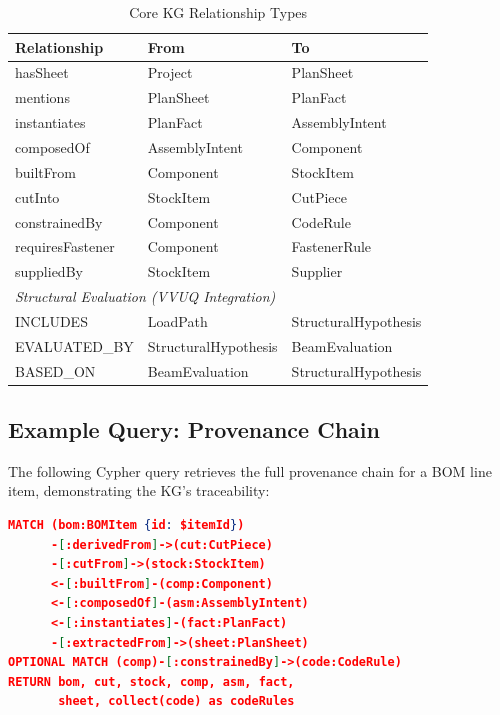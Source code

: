 \begin{table}[ht]
\centering
\caption{Core KG Relationship Types}
\label{tab:kg_relationships}
\begin{tabular}{lll}
\toprule
\textbf{Relationship} & \textbf{From} & \textbf{To} \\
\midrule
hasSheet & Project & PlanSheet \\
mentions & PlanSheet & PlanFact \\
instantiates & PlanFact & AssemblyIntent \\
composedOf & AssemblyIntent & Component \\
builtFrom & Component & StockItem \\
cutInto & StockItem & CutPiece \\
constrainedBy & Component & CodeRule \\
requiresFastener & Component & FastenerRule \\
suppliedBy & StockItem & Supplier \\
\midrule
\multicolumn{3}{l}{\textit{Structural Evaluation (VVUQ Integration)}} \\
\midrule
INCLUDES & LoadPath & StructuralHypothesis \\
EVALUATED\_BY & StructuralHypothesis & BeamEvaluation \\
BASED\_ON & BeamEvaluation & StructuralHypothesis \\
\bottomrule
\end{tabular}
\end{table}

\subsection{Example Query: Provenance Chain}

The following Cypher query retrieves the full provenance chain for a BOM line item, demonstrating the KG's traceability:

\begin{lstlisting}[language=json, basicstyle=\ttfamily\scriptsize]
MATCH (bom:BOMItem {id: $itemId})
      -[:derivedFrom]->(cut:CutPiece)
      -[:cutFrom]->(stock:StockItem)
      <-[:builtFrom]-(comp:Component)
      <-[:composedOf]-(asm:AssemblyIntent)
      <-[:instantiates]-(fact:PlanFact)
      -[:extractedFrom]->(sheet:PlanSheet)
OPTIONAL MATCH (comp)-[:constrainedBy]->(code:CodeRule)
RETURN bom, cut, stock, comp, asm, fact,
       sheet, collect(code) as codeRules
\end{lstlisting}

